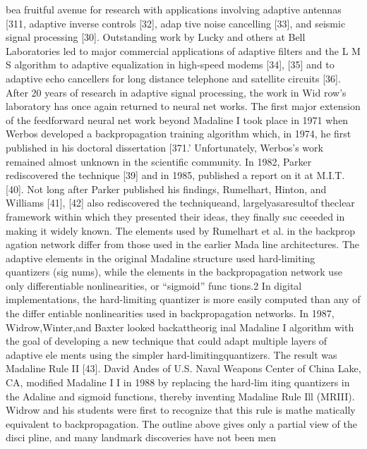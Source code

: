 \documentclass[11pt,a4paper,twocolumn]{article}
\begin{document}
\newpage


bea fruitful avenue for research with applications involving 
adaptive antennas [311, adaptive inverse controls [32], adap
tive noise cancelling [33], and seismic signal processing [30]. 
Outstanding work by Lucky and others at Bell Laboratories 
led to major commercial applications of adaptive filters and 
the L M S  algorithm to adaptive equalization in high-speed 
modems [34], [35] and to adaptive echo cancellers for long
distance telephone and satellite circuits [36]. After 20 years 
of research in adaptive signal processing, the work in Wid
row’s laboratory has once again returned to neural net
works. 
The first major extension of the feedforward neural net
work beyond Madaline I took place in 1971 when Werbos 
developed a backpropagation training algorithm which, in 
1974, he first published in his doctoral dissertation [371.’ 
Unfortunately, Werbos’s work remained almost unknown 
in the scientific community. In 1982, Parker rediscovered 
the technique [39] and in 1985, published a report on it at 
M.I.T. [40]. Not long after Parker published his findings, 
Rumelhart, Hinton, and Williams [41], [42] also rediscovered 
the techniqueand, largelyasaresultof theclear framework 
within which they presented their ideas, they finally suc
ceeeded in making it widely known. 
The elements used by Rumelhart et al. in the backprop
agation network differ from those used in the earlier Mada
line architectures. The adaptive elements in the original 
Madaline structure used hard-limiting quantizers (sig
nums), while the elements in the backpropagation network 
use only differentiable nonlinearities, or “sigmoid” func
tions.2 In digital implementations, 
the hard-limiting 
quantizer is more easily computed than any of the differ
entiable nonlinearities used in backpropagation networks. 
In 1987, Widrow,Winter,and Baxter looked backattheorig
inal Madaline I algorithm with the goal of developing a new 
technique that could adapt multiple layers of adaptive ele
ments using the simpler hard-limitingquantizers. The result 
was Madaline Rule II [43]. 
David Andes of U.S. Naval Weapons Center of China Lake, 
CA, modified Madaline I I  in 1988 by replacing the hard-lim
iting quantizers in the Adaline and sigmoid functions, 
thereby inventing Madaline Rule Ill (MRIII). Widrow and his 
students were first to recognize that this rule is mathe
matically equivalent to backpropagation. 
The outline above gives only a partial view of the disci
pline, and many landmark discoveries have not been men
\end{document}
